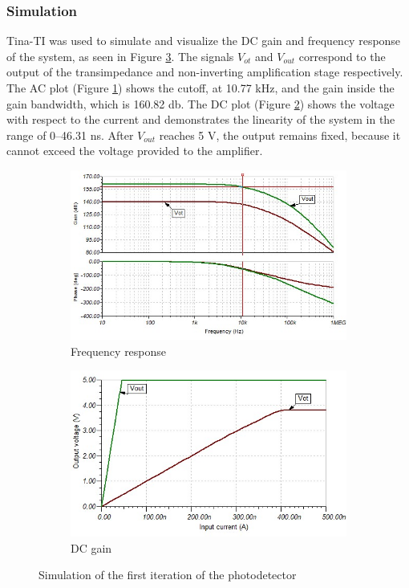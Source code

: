 \subsubsection{Simulation}
Tina-TI was used to simulate and visualize the DC gain and frequency response of the system, as seen in Figure \ref{fig:tina2probes}. The signals $V_{ot}$ and $V_{out}$ correspond to the output of the transimpedance and non-inverting amplification stage respectively. The AC plot (Figure \ref{fig:tinaac2probes}) shows the cutoff, at \num{10,77} \unit{\kilo \hertz}, and the gain inside the gain bandwidth, which is \num{160,82} \unit{\decibel}. The DC plot (Figure \ref{fig:tinadc2probes}) shows the voltage with respect to the current and demonstrates the linearity of the system in the range of \numrange{0}{46,31} \unit{\nano \second}. After $V_{out}$ reaches \num{5} \unit{V}, the output remains fixed, because it cannot exceed the voltage provided to the amplifier. 

\begin{figure}[ht]
	\centering
	\begin{subfigure}[1a]{.49\linewidth}
		\includegraphics[width=\linewidth]{img/tina_AC_2probes}
		\caption{Frequency response}
		\label{fig:tinaac2probes}
	\end{subfigure}
	\hfill
	\begin{subfigure}[1b]{.49\linewidth}
		\includegraphics[width=\linewidth]{img/tina_DC_2probes}
		\caption{DC gain}
		\label{fig:tinadc2probes}
	\end{subfigure}
	\caption{Simulation of the first iteration of the photodetector}
	\label{fig:tina2probes}
\end{figure}


